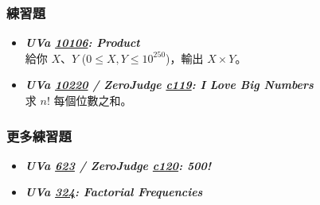 \subsubsection*{練習題}
\begin{itemize}[label={\Checkmark}]
\item \textbf{\textit{UVa \href{http://uva.onlinejudge.org/external/101/10106.html}{10106}: Product}}\\
給你 $X$、$Y$ ($0\leq{X,Y}\leq{10^{250}}$)，輸出 $X\times{Y}$。
\item \textbf{\textit{UVa \href{http://uva.onlinejudge.org/external/102/10220.html}{10220} / ZeroJudge \href{http://zerojudge.tw/ShowProblem?problemid=c119}{c119}: I Love Big Numbers}}\\
求 $n!$ 每個位數之和。
\end{itemize}
\subsubsection*{更多練習題}
\begin{itemize}[label={\PencilLeftDown}]
\item \textbf{\textit{UVa \href{http://uva.onlinejudge.org/external/6/623.html}{623} / ZeroJudge \href{http://zerojudge.tw/ShowProblem?problemid=c120}{c120}: 500!}}
\item \textbf{\textit{UVa \href{http://uva.onlinejudge.org/external/3/324.html}{324}: Factorial Frequencies}}
\end{itemize}
